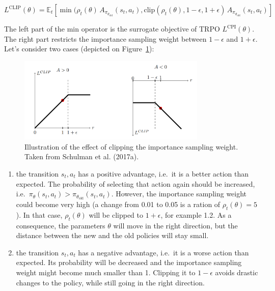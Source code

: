 \documentclass[
  letterpaper,
  DIV=11,
  numbers=noendperiod]{scrreprt}
\begin{document}
\[
    L^\text{CLIP}(\theta) = \mathbb{E}_{t} [ \min (\rho_t(\theta) \, A_{\pi_{\theta_\text{old}}}(s_t, a_t), \text{clip}(\rho_t(\theta) , 1- \epsilon, 1+\epsilon) \,  A_{\pi_{\theta_\text{old}}}(s_t, a_t)]
\]

The left part of the min operator is the surrogate objective of TRPO
\(L^\text{CPI}(\theta)\). The right part restricts the importance
sampling weight between \(1-\epsilon\) and \(1 +\epsilon\). Let's
consider two cases (depicted on Figure~\ref{fig-ppo}):

\begin{figure}

{\centering \includegraphics[width=0.8\textwidth,height=\textheight]{./img/ppo.png}

}

\caption{\label{fig-ppo}Illustration of the effect of clipping the
importance sampling weight. Taken from Schulman et al. (2017a).}

\end{figure}

\begin{enumerate}
\def\labelenumi{\arabic{enumi}.}
\item
  the transition \(s_t, a_t\) has a positive advantage, i.e.~it is a
  better action than expected. The probability of selecting that action
  again should be increased,
  i.e.~\(\pi_\theta(s_t, a_t) > \pi_{\theta_\text{old}}(s_t, a_t)\).
  However, the importance sampling weight could become very high (a
  change from 0.01 to 0.05 is a ration of \(\rho_t(\theta) = 5\)). In
  that case, \(\rho_t(\theta)\) will be clipped to \(1+\epsilon\), for
  example 1.2. As a consequence, the parameters \(\theta\) will move in
  the right direction, but the distance between the new and the old
  policies will stay small.
\item
  the transition \(s_t, a_t\) has a negative advantage, i.e.~it is a
  worse action than expected. Its probability will be decreased and the
  importance sampling weight might become much smaller than 1. Clipping
  it to \(1-\epsilon\) avoids drastic changes to the policy, while still
  going in the right direction.
\end{enumerate}
\end{document}
